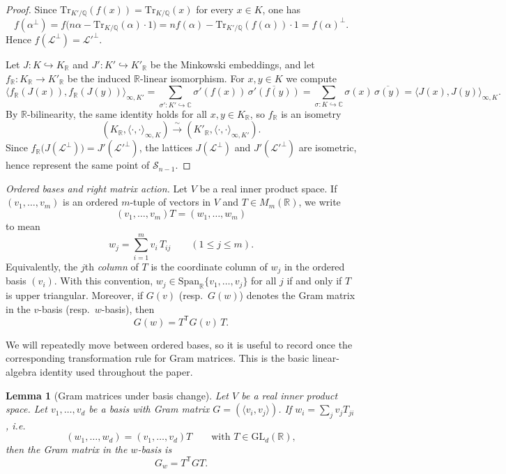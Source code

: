 \documentclass[11pt,letterpaper]{amsart}
\newcommand{\Q}{\mathbb{Q}}
\newcommand{\R}{\mathbb{R}}
\newcommand{\C}{\mathbb{C}}
\newcommand{\GL}{\mathrm{GL}}
\newcommand{\Tr}{\mathrm{Tr}}
\theoremstyle{plain}
\newtheorem{lemma}[theorem]{Lemma}
\theoremstyle{definition}
\begin{document}
\begin{proof}
Since $\Tr_{K'/\Q}(f(x))=\Tr_{K/\Q}(x)$ for every $x\in K$, one has
\[
f(\alpha^\perp)
=f\bigl(n\alpha-\Tr_{K/\Q}(\alpha)\cdot 1\bigr)
=nf(\alpha)-\Tr_{K'/\Q}(f(\alpha))\cdot 1
=f(\alpha)^\perp.
\]
Hence $f(\mathcal L^\perp)=\mathcal L'^\perp$.

Let $J:K\hookrightarrow K_\R$ and $J':K'\hookrightarrow K'_\R$ be the Minkowski embeddings, and let
$f_\R:K_\R\to K'_\R$ be the induced $\R$-linear isomorphism. For $x,y\in K$ we compute
\[
\langle f_\R(J(x)),f_\R(J(y))\rangle_{\infty,K'}
=\sum_{\sigma':K'\hookrightarrow \C}\sigma'(f(x))\,\overline{\sigma'(f(y))}
=\sum_{\sigma:K\hookrightarrow \C}\sigma(x)\,\overline{\sigma(y)}
=\langle J(x),J(y)\rangle_{\infty,K}.
\]
By $\R$-bilinearity, the same identity holds for all $x,y\in K_\R$, so $f_\R$ is an isometry
\[
(K_\R,\langle\cdot,\cdot\rangle_{\infty,K})\xrightarrow{\ \sim\ }(K'_\R,\langle\cdot,\cdot\rangle_{\infty,K'}).
\]
Since $f_\R\bigl(J(\mathcal L^\perp)\bigr)=J'(\mathcal L'^\perp)$, the lattices $J(\mathcal L^\perp)$ and
$J'(\mathcal L'^\perp)$ are isometric, hence represent the same point of $\mathscr S_{n-1}$.
\end{proof}

\emph{Ordered bases and right matrix action.}\label{conv:right-action}
Let $V$ be a real inner product space.
If $(v_1,\dots,v_m)$ is an ordered $m$-tuple of vectors in $V$ and $T\in M_m(\R)$, we write
\[
(v_1,\dots,v_m)T=(w_1,\dots,w_m)
\]
to mean
\[
w_j=\sum_{i=1}^m v_i\,T_{ij}\qquad(1\le j\le m).
\]
Equivalently, the $j$th \emph{column} of $T$ is the coordinate column of $w_j$ in the ordered basis
$(v_i)$.
With this convention, $w_j\in \mathrm{Span}_\R\{v_1,\dots,v_j\}$ for all $j$ if and only if $T$ is upper triangular.
Moreover, if $G(v)$ (resp.\ $G(w)$) denotes the Gram matrix in the $v$-basis (resp.\ $w$-basis), then
\[
G(w)=T^{\mathsf T}G(v)\,T.
\]

We will repeatedly move between ordered bases, so it is useful to record once the corresponding transformation rule for Gram matrices. This is the basic linear-algebra identity used throughout the paper.

\begin{lemma}[Gram matrices under basis change]\label{lem:gram-congruence}
Let $V$ be a real inner product space.
Let $v_1,\dots,v_d$ be a basis with Gram matrix $G=(\langle v_i,v_j\rangle)$.
If $w_i=\sum_j v_jT_{ji}$, i.e.
\[
(w_1,\dots,w_d)=(v_1,\dots,v_d)T
\qquad\text{with }T\in\GL_d(\R),
\]
then the Gram matrix in the $w$-basis is
\[
G_w=T^{\mathsf T}GT.
\]
\end{lemma}
\end{document}
